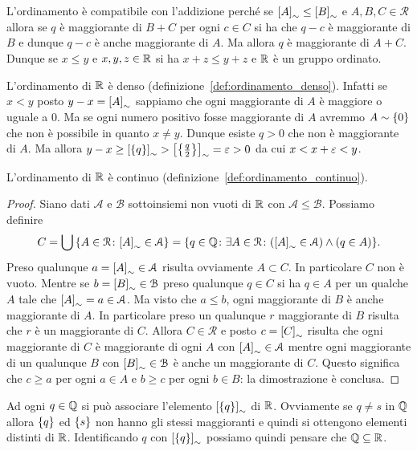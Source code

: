 L'ordinamento è compatibile con l'addizione perché se ${\left[ A \right]}_\sim 
\le {\left[ B \right]}_\sim$ e $A,B,C\in \mathcal R$ 
allora se $q$ è maggiorante di $B+C$ per ogni $c\in C$ si ha che $q-c$ 
è maggiorante di $B$ e dunque $q-c$ è anche maggiorante di $A$.
Ma allora $q$ è maggiorante di $A+C$. Dunque se $x\le y$ e $x,y,z\in {\mathbb R}$ 
si ha $x+z\le y+z$ e ${\mathbb R}$ è un gruppo ordinato.

L'ordinamento di ${\mathbb R}$ è denso (definizione~\ref{def:ordinamento_denso}). 
Infatti se $x<y$ posto $y-x={\left[ A \right]}_\sim$ 
sappiamo che ogni maggiorante di $A$ è maggiore o uguale a $0$.
Ma se ogni numero positivo fosse maggiorante di $A$ avremmo $A\sim{\left\{ 0 \right\}}$
che non è possibile in quanto $x\neq y$. Dunque esiste $q>0$ 
che non è maggiorante di $A$. 
Ma allora $y-x \ge {\left[ {\left\{ q \right\}} \right]}_\sim > {\left[ {\left\{ \frac q 2 \right\}} \right]}_\sim = \varepsilon > 0$
da cui $x<x+\varepsilon<y$.

\begin{theorem}  
L'ordinamento di ${\mathbb R}$ è continuo
(definizione~\ref{def:ordinamento_continuo}).
\end{theorem}
\begin{proof}
Siano dati $\mathcal A$ e $\mathcal B$ sottoinsiemi non vuoti di ${\mathbb R}$ 
con $\mathcal A\le \mathcal B$. 
Possiamo definire
\[
  C = \bigcup{\left\{ A\in \mathcal R\colon {\left[ A \right]}_\sim \in \mathcal A \right\}} 
    = {\left\{ q\in {\mathbb Q}\colon \exists A\in \mathcal R\colon 
    ({\left[ A \right]}_\sim \in \mathcal A) \land (q\in A) \right\}}.
\]
Preso qualunque $a={\left[ A \right]}_\sim \in \mathcal A$ risulta 
ovviamente $A\subset C$. In particolare $C$ non è vuoto.
Mentre se $b={\left[ B \right]}_\sim \in \mathcal B$ 
preso qualunque $q\in C$ si ha $q\in A$ per un qualche $A$ tale che 
${\left[ A \right]}_\sim = a\in \mathcal A$.
Ma visto che $a\le b$, ogni maggiorante di $B$ è anche maggiorante di $A$.
In particolare preso un qualunque $r$ maggiorante di $B$
risulta che $r$ è un maggiorante di $C$.
Allora $C\in \mathcal R$ e posto $c={\left[ C \right]}_\sim$ 
risulta che ogni maggiorante di $C$ è maggiorante di 
ogni $A$ con ${\left[ A \right]}_\sim \in \mathcal A$ mentre 
ogni maggiorante di un qualunque $B$ con ${\left[ B \right]}_\sim\in \mathcal B$ 
è anche un maggiorante di $C$.
Questo significa che $c\ge a$ per ogni $a\in A$ 
e $b\ge c$ per ogni $b\in B$: la dimostrazione è conclusa.
\end{proof}

Ad ogni $q\in {\mathbb Q}$ si può associare l'elemento ${\left[ {\left\{ q \right\}} \right]}_\sim$ 
di ${\mathbb R}$. Ovviamente se $q\neq s$ in ${\mathbb Q}$ allora ${\left\{ q \right\}}$ 
ed ${\left\{ s \right\}}$ non hanno gli stessi maggioranti e quindi si ottengono 
elementi distinti di ${\mathbb R}$. Identificando $q$ con ${\left[ {\left\{ q \right\}} \right]}_\sim$ 
possiamo quindi pensare che ${\mathbb Q} \subseteq {\mathbb R}$.

